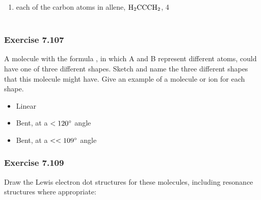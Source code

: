 \documentclass[11pt]{article}
\begin{document}
\begin{enumerate}
\item each of the carbon atoms in allene, $\ce{H2CCCH2}$, 4  \\[2ex]
 \\[2ex]

\end{enumerate}

\subsubsection{Exercise 7.107}

A molecule with the formula , in which A and B represent different atoms, could have one of three different shapes. Sketch and name the three different shapes that this molecule might have. Give an example of a molecule or ion for each shape.

\begin{itemize}

\item Linear

\item Bent, at a $<120\degree $ angle

\item Bent, at a $<<109\degree$ angle

\end{itemize}


\subsubsection{Exercise 7.109}

Draw the Lewis electron dot structures for these molecules, including resonance structures where appropriate: \\[2ex]
\end{document}
